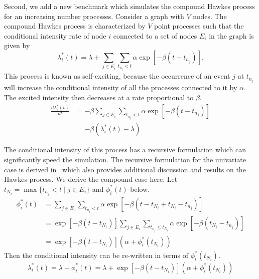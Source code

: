 \documentclass{juliacon}
\numberwithin{equation}{section}
\begin{document}
Second, we add a new benchmark which simulates the compound Hawkes process for an increasing number processes. Consider a graph with \( V \) nodes. The compound Hawkes process is characterized by \( V \) point processes such that the conditional intensity rate of node \( i \) connected to a set of nodes \( E_i \) in the graph is given by
\begin{equation}
  \lambda_i^\ast (t) = \lambda + \sum_{j \in E_i} \sum_{t_{n_j} < t} \alpha \exp \left[-\beta (t - t_{n_j}) \right].
\end{equation}
This process is known as self-exciting, because the occurrence of an event \( j \) at \( t_{n_j} \) will increase the conditional intensity of all the processes connected to it by \( \alpha \). The excited intensity then decreases at a rate proportional to \( \beta \).
\begin{equation}
\begin{split}
  \frac{d \lambda_i^\ast (t)}{d t}
    &= -\beta \sum_{j \in E_i} \sum_{t_{n_j} < t} \alpha \exp \left[-\beta (t - t_{n_j}) \right] \\
    &= -\beta \left( \lambda_i^\ast (t) - \lambda \right)
\end{split}
\end{equation}

The conditional intensity of this process has a recursive formulation which can significantly speed the simulation. The recursive formulation for the univariate case is derived in~\cite{laub2021} which also provides additional discussion and results on the Hawkes process. We derive the compound case here. Let \( t_{N_i} = \max \{ t_{n_j} < t \mid j \in E_i \} \) and \( \phi_i^\ast (t) \) below.
\begin{equation}
\begin{split}
  \phi_i^\ast (t)
    &= \sum_{j \in E_i} \sum_{t_{n_j} < t} \alpha \exp \left[-\beta (t - t_{N_i} + t_{N_i} - t_{n_j}) \right] \\
    &= \exp \left[ -\beta (t - t_{N_i}) \right] \sum_{j \in E_i} \sum_{t_{n_j} \leq t_{N_i}} \alpha \exp \left[-\beta (t_{N_i} - t_{n_j}) \right] \\
    &= \exp \left[ -\beta (t - t_{N_i}) \right] \left( \alpha + \phi_i^\ast (t_{N_i}) \right)
\end{split}
\end{equation}
Then the conditional intensity can be re-written in terms of \( \phi_i^\ast (t_{N_i}) \).
\begin{equation}
  \lambda_i^\ast (t) = \lambda + \phi_i^\ast (t) = \lambda + \exp \left[ -\beta (t - t_{N_i}) \right] \left( \alpha + \phi_i^\ast (t_{N_i}) \right)
\end{equation}
\end{document}

